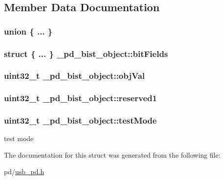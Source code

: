 \subsection{Member Data Documentation}
\hypertarget{struct__pd__bist__object_adeb0155b9309808fe627dac8ea0a3c6b}{\subsubsection[{"@56}]{\setlength{\rightskip}{0pt plus 5cm}union \{ ... \} }}\label{struct__pd__bist__object_adeb0155b9309808fe627dac8ea0a3c6b}
\hypertarget{struct__pd__bist__object_a849300b1862887c8f556ed20b6e444af}{
\subsubsection[{bit\-Fields}]{\setlength{\rightskip}{0pt plus 5cm}struct \{ ... \}   \-\_\-pd\-\_\-bist\-\_\-object\-::bit\-Fields}}\label{struct__pd__bist__object_a849300b1862887c8f556ed20b6e444af}
\hypertarget{struct__pd__bist__object_a780969d466c2145fb4e91c308f62682d}{
\subsubsection[{obj\-Val}]{\setlength{\rightskip}{0pt plus 5cm}uint32\-\_\-t \-\_\-pd\-\_\-bist\-\_\-object\-::obj\-Val}}\label{struct__pd__bist__object_a780969d466c2145fb4e91c308f62682d}
\hypertarget{struct__pd__bist__object_ad8bd8067b2567523f31cfa44fffa7171}{
\subsubsection[{reserved1}]{\setlength{\rightskip}{0pt plus 5cm}uint32\-\_\-t \-\_\-pd\-\_\-bist\-\_\-object\-::reserved1}}\label{struct__pd__bist__object_ad8bd8067b2567523f31cfa44fffa7171}
\hypertarget{struct__pd__bist__object_a70c61e157a9bafe1d5cb6435212ae557}{
\subsubsection[{test\-Mode}]{\setlength{\rightskip}{0pt plus 5cm}uint32\-\_\-t \-\_\-pd\-\_\-bist\-\_\-object\-::test\-Mode}}\label{struct__pd__bist__object_a70c61e157a9bafe1d5cb6435212ae557}
test mode 

The documentation for this struct was generated from the following file\-:\begin{DoxyCompactItemize}
\item 
pd/\hyperlink{usb__pd_8h}{usb\-\_\-pd.\-h}\end{DoxyCompactItemize}
